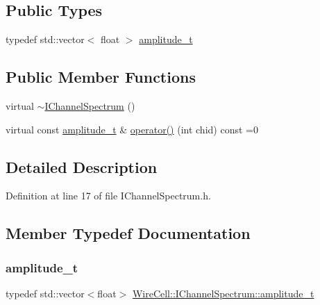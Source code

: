 \subsection*{Public Types}
\begin{DoxyCompactItemize}
\item 
typedef std\+::vector$<$ float $>$ \hyperlink{class_wire_cell_1_1_i_channel_spectrum_a9af7bfed961f49dc8a532fd5d0bf3e6e}{amplitude\+\_\+t}
\end{DoxyCompactItemize}
\subsection*{Public Member Functions}
\begin{DoxyCompactItemize}
\item 
virtual \hyperlink{class_wire_cell_1_1_i_channel_spectrum_ad751811a830ad115e233604435209844}{$\sim$\+I\+Channel\+Spectrum} ()
\item 
virtual const \hyperlink{class_wire_cell_1_1_i_channel_spectrum_a9af7bfed961f49dc8a532fd5d0bf3e6e}{amplitude\+\_\+t} \& \hyperlink{class_wire_cell_1_1_i_channel_spectrum_a587c11bd2e39e3136b1b60268d22bf9f}{operator()} (int chid) const =0
\end{DoxyCompactItemize}


\subsection{Detailed Description}


Definition at line 17 of file I\+Channel\+Spectrum.\+h.



\subsection{Member Typedef Documentation}
\mbox{\label{class_wire_cell_1_1_i_channel_spectrum_a9af7bfed961f49dc8a532fd5d0bf3e6e}} 
\subsubsection{\texorpdfstring{amplitude\+\_\+t}{amplitude\_t}}
{\footnotesize\ttfamily typedef std\+::vector$<$float$>$ \hyperlink{class_wire_cell_1_1_i_channel_spectrum_a9af7bfed961f49dc8a532fd5d0bf3e6e}{Wire\+Cell\+::\+I\+Channel\+Spectrum\+::amplitude\+\_\+t}}

